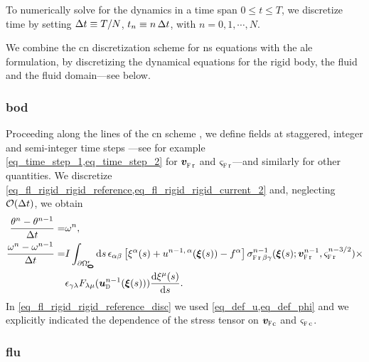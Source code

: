 To numerically solve for the dynamics in a time span $0 \leq t \leq T$, we discretize time by setting ${\Delta t} \equiv T/N$, $t_n \equiv n\, {\Delta t}$, with $n = 0, 1, \cdots, N$.

We combine the \ac{cn} discretization scheme for \ac{ns} equations \cite{loggAutomatedSolutionDifferential2012,crankPracticalMethodNumerical1947} with the \ac{ale} formulation, by discretizing the dynamical equations for the rigid body, the fluid and the fluid domain---see below.

\subsubsection{\Acl{bod}}



Proceeding along the lines of the \ac{cn} scheme \cite{crankPracticalMethodNumerical1947}, we define fields at staggered,  integer and semi-integer time steps  \cite{loggAutomatedSolutionDifferential2012}---see for example \cref{eq_time_step_1,eq_time_step_2} for $\bvfr{}$ and $\sigmafr{}$---and similarly for other quantities.
We discretize \cref{eq_fl_rigid_rigid_reference,eq_fl_rigid_rigid_current_2} and, neglecting ${{\cal O}({\Delta t})}$, we obtain
\bw
\begin{align}
        \label{eq_def_omega_disc}
        \frac{\theta^n - \theta^{n-1}}{\deltat}     = & \omega^n       ,                                                                         \\
        \label{eq_fl_rigid_rigid_reference_disc}
        \frac{\omega^n - \omega^{n-1}}{\deltat}  =    &
        I  \int_\pomellipseeqr \dint{s} \, \epsilon_{\alpha \beta} \left[ \xi^\alpha(s) + u^{n-1,\, \alpha}(\bxi{s})- \focalpoint^\alpha \right]                                                                             \sigmastressr{\beta}{\gamma}^{n-1}(\bxi{s}; {\bvfr{n-1}, \sigmafr{\nmthalf}}) \times \newlinenn
                                                      & \epsilon_{\gamma \lambda} F_{\lambda \mu}(\budom^{n-1}(\bxi{s})) \der{\xi^\mu(s)} {s}  .
\end{align}
\ew
In \cref{eq_fl_rigid_rigid_reference_disc} we used \cref{eq_def_u,eq_def_phi} and we  explicitly indicated the dependence of the stress tensor  on $\bm \vfc$ and $\sigmafc{}$.




\subsubsection{\Acl{flu}}
\label{sec_splitting_scheme_fl_rig_fl}

